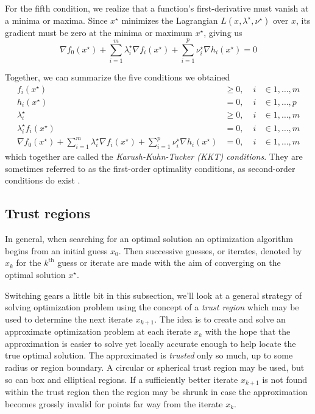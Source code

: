 For the fifth condition, we realize that a function's first-derivative must vanish at a minima or maxima. Since $x^\star$ minimizes the Lagrangian $L(x, \lambda^\star, \nu^\star)$ over $x$, its gradient must be zero at the minima or maximum $x^\star$, giving us
\begin{equation}
\nabla f_0(x^\star) + \sum_{i=1}^m \lambda_i^\star \nabla f_i(x^\star)
+ \sum_{i=1}^p \nu_i^\star \nabla h_i(x^\star) = 0
\end{equation}

Together, we can summarize the five conditions we obtained
\begin{align} \label{eq:kkt}
f_i(x^\star) & \geq 0, \; & i & \in {1,\dots,m} \nonumber \\
h_i(x^\star) & = 0, \; & i & \in {1,\dots,p} \nonumber \\
\lambda_i^\star & \geq 0, \; & i & \in {1,\dots,m} \\
\lambda_i^\star f_i(x^\star) & = 0, \; & i & \in {1,\dots,m} \nonumber \\
\nabla f_0(x^\star) + \sum_{i=1}^m \lambda_i^\star \nabla f_i(x^\star)
+ \sum_{i=1}^p \nu_i^\star \nabla h_i(x^\star) & = 0, \; & i & \in {1,\dots,m} \nonumber
\end{align}
which together are called the \emph{Karush-Kuhn-Tucker (KKT) conditions}. They are sometimes referred to as the first-order optimality conditions, as second-order conditions do exist \citep[\S 12.5]{Nocedal06}.

\subsection{Trust regions} \label{ssec:trust}
In general, when searching for an optimal solution an optimization algorithm begins from an initial guess $x_0$. Then successive guesses, or iterates, denoted by $x_k$ for the $k^\mathrm{th}$ guess or iterate are made with the aim of converging on the optimal solution $x^\star$.

Switching gears a little bit in this subsection, we'll look at a general strategy of solving optimization problem using the concept of a \emph{trust region} which may be used to determine the next iterate $x_{k+1}$. The idea is to create and solve an approximate optimization problem at each iterate $x_k$ with the hope that the approximation is easier to solve yet locally accurate enough to help locate the true optimal solution. The approximated is \emph{trusted} only so much, up to some radius or region boundary. A circular or spherical trust region may be used, but so can box and elliptical regions. If a sufficiently better iterate $x_{k+1}$ is not found within the trust region then the region may be shrunk in case the approximation becomes grossly invalid for points far way from the iterate $x_k$.

